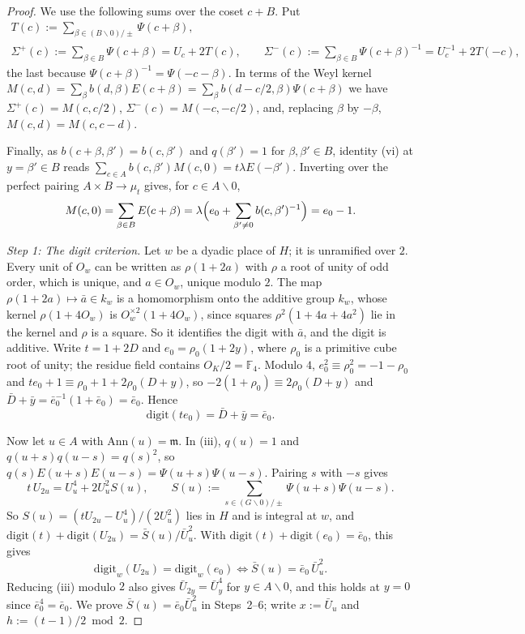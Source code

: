\documentclass[11pt]{amsart}
\numberwithin{equation}{section}
\theoremstyle{plain}
\theoremstyle{definition}
\theoremstyle{remark}
\begin{document}
\begin{proof}
We use the following sums over the coset \(c+B\). Put
\begin{gather*}
T(c):=\sum_{\beta\in(B\smallsetminus0)/\pm}\Psi(c+\beta),\\
\Sigma^+(c):=\sum_{\beta\in B}\Psi(c+\beta)=U_c+2T(c),\qquad\Sigma^-(c):=\sum_{\beta\in B}\Psi(c+\beta)^{-1}=U_c^{-1}+2T(-c),
\end{gather*}
the last because \(\Psi(c+\beta)^{-1}=\Psi(-c-\beta)\). In terms of the Weyl kernel \(M(c,d)=\sum_\beta b(d,\beta)E(c+\beta)=\sum_\beta b(d-c/2,\beta)\Psi(c+\beta)\) we have \(\Sigma^+(c)=M(c,c/2)\), \(\Sigma^-(c)=M(-c,-c/2)\), and, replacing \(\beta\) by \(-\beta\), \(M(c,d)=M(c,c-d)\).

Finally, as \(b(c+\beta,\beta')=b(c,\beta')\) and \(q(\beta')=1\) for \(\beta,\beta'\in B\), identity (vi) at \(y=\beta'\in B\) reads \(\sum_{c\in A}b(c,\beta')M(c,0)=t\lambda E(-\beta')\). Inverting over the perfect pairing \(A\times B\to\mu_t\) gives, for \(c\in A\smallsetminus0\),
\[M(c,0)=\sum_{\beta\in B}E(c+\beta)=\lambda\Bigl(e_0+\sum_{\beta'\ne0}b(c,\beta')^{-1}\Bigr)=e_0-1 .\]

\emph{Step 1: The digit criterion.} Let \(w\) be a dyadic place of \(H\); it is unramified over \(2\). Every unit of \(O_w\) can be written as \(\rho(1+2a)\) with \(\rho\) a root of unity of odd order, which is unique, and \(a\in O_w\), unique modulo \(2\). The map \(\rho(1+2a)\mapsto\bar a\in k_w\) is a homomorphism onto the additive group \(k_w\), whose kernel \(\rho(1+4O_w)\) is \(O_w^{\times2}(1+4O_w)\), since squares \(\rho^2(1+4a+4a^2)\) lie in the kernel and \(\rho\) is a square. So it identifies the digit with \(\bar a\), and the digit is additive. Write \(t=1+2D\) and \(e_0=\rho_0(1+2y)\), where \(\rho_0\) is a primitive cube root of unity; the residue field contains \(O_K/2=\mathbb F_4\). Modulo \(4\), \(e_0^2\equiv\rho_0^2=-1-\rho_0\) and \(te_0+1\equiv\rho_0+1+2\rho_0(D+y)\), so \(-2(1+\rho_0)\equiv2\rho_0(D+y)\) and \(\bar D+\bar y=\bar e_0^{-1}(1+\bar e_0)=\bar e_0\). Hence
\[\mathrm{digit}(te_0)=\bar D+\bar y=\bar e_0 .\]

Now let \(u\in A\) with \(\mathrm{Ann}(u)=\mathfrak m\). In (iii), \(q(u)=1\) and \(q(u+s)q(u-s)=q(s)^2\), so \(q(s)E(u+s)E(u-s)=\Psi(u+s)\Psi(u-s)\). Pairing \(s\) with \(-s\) gives
\[t\,U_{2u}=U_u^4+2U_u^2S(u),\qquad S(u):=\sum_{s\in(G\smallsetminus0)/\pm}\Psi(u+s)\Psi(u-s).\]
So \(S(u)=(tU_{2u}-U_u^4)/(2U_u^2)\) lies in \(H\) and is integral at \(w\), and \(\mathrm{digit}(t)+\mathrm{digit}(U_{2u})=\bar S(u)/\bar U_u^2\). With \(\mathrm{digit}(t)+\mathrm{digit}(e_0)=\bar e_0\), this gives
\[\mathrm{digit}_w(U_{2u})=\mathrm{digit}_w(e_0)\iff\bar S(u)=\bar e_0\,\bar U_u^2 .\]
Reducing (iii) modulo \(2\) also gives \(\bar U_{2y}=\bar U_y^4\) for \(y\in A\smallsetminus0\), and this holds at \(y=0\) since \(\bar e_0^4=\bar e_0\). We prove \(\bar S(u)=\bar e_0\bar U_u^2\) in Steps~2--6; write \(x:=\bar U_u\) and \(h:=(t-1)/2\bmod2\).


\end{proof}
\end{document}

